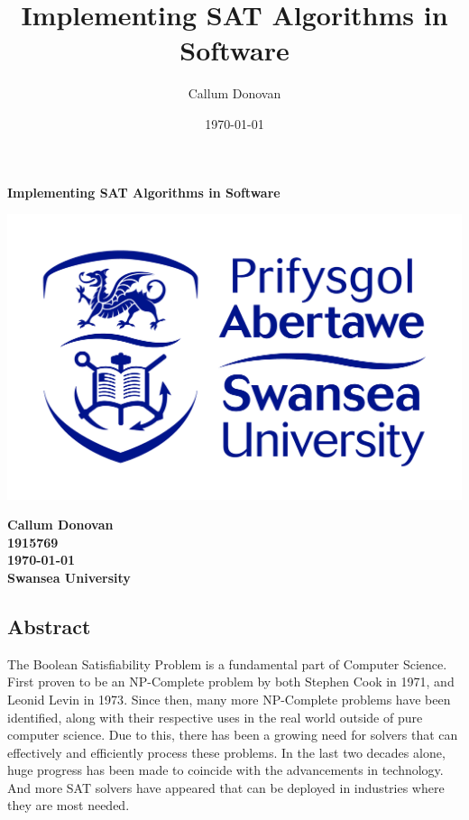 \documentclass{article}
\title{\bfseries Implementing SAT Algorithms in Software}
\author{Callum Donovan}
\date{ \today }
\begin{document}
\begin{titlepage}
    \begin{center}
        \Large{\bfseries Implementing SAT Algorithms in Software} \\
        \vspace*{\fill}
        \begin{center}
            \includegraphics[scale=0.15]{swan.jpg}
        \end{center}
        \vspace*{\fill}
        \bfseries{\large Callum Donovan \\
            1915769 \\
            \today \\
            Swansea University \\}
    \end{center}
\end{titlepage}


\thispagestyle{empty}
\begin{center}
\section*{Abstract}
\end{center}
The Boolean Satisfiability Problem is a fundamental part of Computer Science. First proven to be an
NP-Complete problem by both Stephen Cook in 1971\cite{scook}, and Leonid Levin in 1973\cite{levin}. Since then, many more
NP-Complete problems have been identified, along with their respective uses in the real world
outside of pure computer science. Due to this, there has been a growing need for solvers that can
effectively and efficiently process these problems. In the last two decades alone, huge progress has
been made to coincide with the advancements in technology. And more SAT solvers have appeared that
can be deployed in industries where they are most needed.
\end{document}
